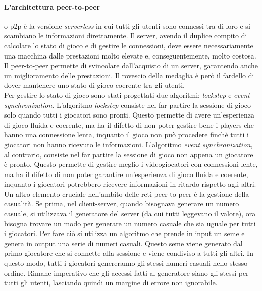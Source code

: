         \paragraph{L'architettura peer-to-peer} o p2p è la versione \textit{serverless} in cui tutti gli utenti sono connessi tra di loro e si scambiano le 
            informazioni direttamente. Il server, avendo il duplice compito di calcolare lo stato di gioco e di gestire le connessioni, deve essere necessariamente una macchina 
            dalle prestazioni molto elevate e, conseguentemente, molto costosa. Il peer-to-peer permette di svincolare dall'acquisto di un server, garantendo anche un miglioramento 
            delle prestazioni. Il rovescio della medaglia è però il fardello di dover mantenere uno stato di gioco coerente tra gli utenti.\\
            Per gestire lo stato di gioco sono stati progettati due algoritmi: \textit{lockstep} e \textit{event synchronization}. L'algoritmo \textit{lockstep} consiste nel far 
            partire la sessione di gioco solo quando tutti i giocatori sono pronti. Questo permette di avere un'esperienza di gioco fluida e coerente, ma ha il difetto di non poter 
            gestire bene i players che hanno una connessione lenta, inquanto il gioco non può procedere finchè tutti i giocatori
            non hanno ricevuto le informazioni. L'algoritmo \textit{event synchronization}, al contrario, consiste nel far partire la sessione di gioco non appena un giocatore è
            pronto. Questo permette di gestire meglio i videogiocatori con connessioni lente, ma ha il difetto di non poter garantire un'esperienza di gioco fluida e coerente, inquanto
            i giocatori potrebbero ricevere informazioni in ritardo rispetto agli altri.\\
            Un altro elemento cruciale nell'ambito delle reti peer-to-peer è la gestione della casualità. Se prima, nel client-server, quando bisognava generare un numero casuale, 
            si utilizzava il generatore del server (da cui tutti leggevano il valore), ora bisogna trovare un modo per generare un numero casuale che sia uguale per tutti i giocatori.
            Per fare ciò si utilizza un algoritmo che prende in input un seme e genera in output una serie di numeri casuali. Questo seme viene generato dal primo giocatore che si connette
            alla sessione e viene condiviso a tutti gli altri. In questo modo, tutti i giocatori genereranno gli stessi numeri casuali nello stesso ordine. Rimane
            imperativo che gli accessi fatti al generatore siano gli stessi per tutti gli utenti, lasciando quindi un margine di errore non ignorabile.\\
